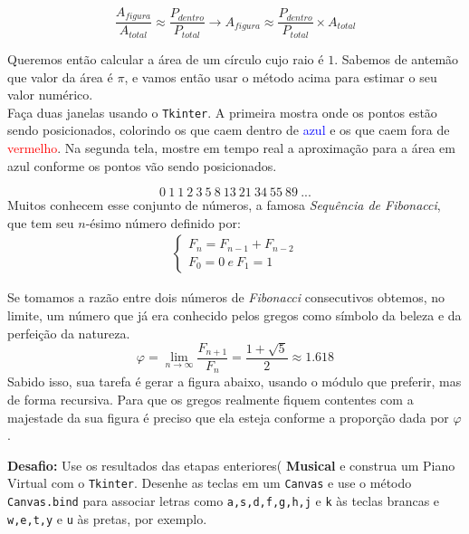 \documentclass[12pt]{article}
\begin{document}
	$$ \frac{A_{figura}}{A_{total}} \approx \frac{P_{dentro}}{P_{total}} \to A_{figura} \approx \frac{P_{dentro}}{P_{total}} \times A_{total} $$

	Queremos então calcular a área de um círculo cujo raio é $1$. Sabemos de antemão que valor da área é $\pi$, e vamos então usar o método acima para estimar o seu valor numérico.\\

	Faça duas janelas usando o \texttt{Tkinter}. A primeira mostra onde os pontos estão sendo posicionados, colorindo os que caem dentro de \textcolor{blue}{azul} e os que caem fora de \textcolor{red}{vermelho}. Na segunda tela, mostre em tempo real a aproximação para a área em azul conforme os pontos vão sendo posicionados. \\
	
	
	
	\[0\ 1\ 1\ 2\ 3\ 5\ 8\ 13\ 21\ 34\ 55\ 89\ ... \]	
	Muitos conhecem esse conjunto de números, a famosa \emph{Sequência de Fibonacci}, que tem seu $n$-ésimo número definido por:
	\begin{align*}
	\begin{cases}
	F_{n} = F_{n-1} + F_{n-2}\\
	F_{0} = 0 \ e \ F_{1} = 1
	\end{cases}
	\end{align*}
	
	Se tomamos a razão entre dois números de \emph{Fibonacci} consecutivos obtemos, no limite, um número que já era conhecido pelos gregos como símbolo da beleza e da perfeição da natureza.
	$$\varphi = \lim_{n \to \infty} \frac{F_{n+1}}{F_{n}}= \frac{1+\sqrt{5}}{2} \approx 1.618 $$
	Sabido isso, sua tarefa é gerar a figura abaixo, usando o módulo que preferir, mas de forma recursiva. Para que os gregos realmente fiquem contentes com a majestade da sua figura é preciso que ela esteja conforme a proporção dada por $\varphi$.
	
	
	
	\textbf{Desafio:} Use os resultados das etapas enteriores( \textbf{Musical} e construa um Piano Virtual com o \texttt{Tkinter}. Desenhe as teclas em um \texttt{Canvas} e use o método \texttt{Canvas.bind} para associar letras como \texttt{a,s,d,f,g,h,j} e \texttt{k} às teclas brancas e \texttt{w,e,t,y} e \texttt{u} às pretas, por exemplo.
\end{document}
